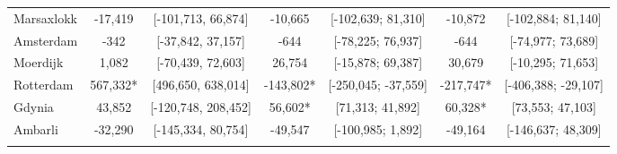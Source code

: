 \begin{table}[ht]
\begin{adjustbox}{max width=\textwidth}
\begin{tabular}{lcccccc}
  Marsaxlokk & -17,419 & [-101,713, 66,874] &  -10,665 & [-102,639; 81,310] &  -10,872 & [-102,884; 81,140] \\ 
  Amsterdam &    -342 & [-37,842, 37,157] &     -644 & [-78,225; 76,937] &     -644 & [-74,977; 73,689] \\ 
  Moerdijk &   1,082 & [-70,439, 72,603] &   26,754 & [-15,878; 69,387] &   30,679 & [-10,295; 71,653] \\ 
  Rotterdam & 567,332* & [496,650, 638,014] & -143,802* & [-250,045; -37,559] & -217,747* & [-406,388; -29,107] \\ 
  Gdynia &  43,852 & [-120,748, 208,452] &   56,602* & [71,313; 41,892] &   60,328* & [73,553; 47,103] \\ 
  Ambarli & -32,290 & [-145,334, 80,754] &  -49,547 & [-100,985; 1,892] &  -49,164 & [-146,637; 48,309] \\ 
   [2ex] \hline \hline {}\end{tabular} 
 \end{adjustbox}
\endgroup
\end{table}
